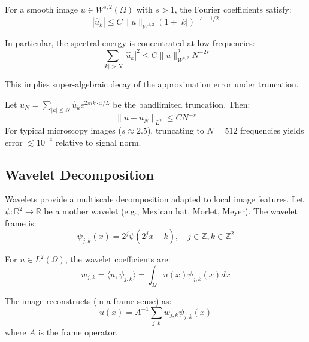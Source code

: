 \documentclass[twocolumn,11pt]{article}
\begin{document}
\begin{theorem}
For a smooth image $u \in W^{s,2}(\Omega)$ with $s > 1$, the Fourier coefficients satisfy:
\begin{equation}
|\hat{u}_k| \leq C \|u\|_{W^{s,2}} (1 + |k|)^{-s-1/2}
\end{equation}

In particular, the spectral energy is concentrated at low frequencies:
\begin{equation}
\sum_{|k| > N} |\hat{u}_k|^2 \leq C \|u\|_{W^{s,2}}^2 N^{-2s}
\end{equation}

This implies super-algebraic decay of the approximation error under truncation.
\end{theorem}

\begin{corollary}
Let $u_N = \sum_{|k| \leq N} \hat{u}_k e^{2\pi i k \cdot x / L}$ be the bandlimited truncation. Then:
\begin{equation}
\|u - u_N\|_{L^2} \leq C N^{-s}
\end{equation}
For typical microscopy images ($s \approx 2.5$), truncating to $N = 512$ frequencies yields error $\lesssim 10^{-4}$ relative to signal norm.
\end{corollary}

\subsection{Wavelet Decomposition}

Wavelets provide a multiscale decomposition adapted to local image features. Let $\psi: \mathbb{R}^2 \to \mathbb{R}$ be a mother wavelet (e.g., Mexican hat, Morlet, Meyer). The wavelet frame is:
\begin{equation}
\psi_{j,k}(x) = 2^j \psi(2^j x - k), \quad j \in \mathbb{Z}, k \in \mathbb{Z}^2
\end{equation}

\begin{definition}
For $u \in L^2(\Omega)$, the wavelet coefficients are:
\begin{equation}
w_{j,k} = \langle u, \psi_{j,k} \rangle = \int_\Omega u(x) \psi_{j,k}(x) dx
\end{equation}

The image reconstructs (in a frame sense) as:
\begin{equation}
u(x) = A^{-1} \sum_{j,k} w_{j,k} \psi_{j,k}(x)
\end{equation}
where $A$ is the frame operator.
\end{definition}
\end{document}
